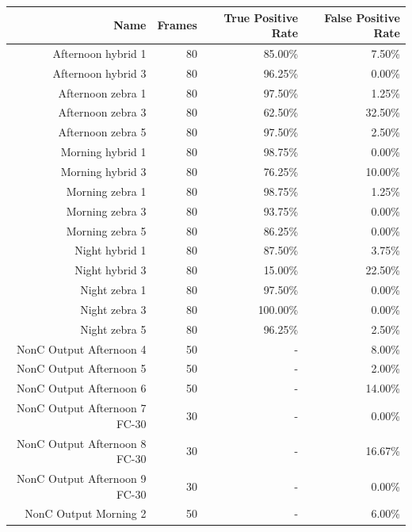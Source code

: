 \documentclass[12pt]{ucthesis}
\begin{document}
    \begin{longtable}{|r|r|r|r|}
    
    \hline
    Name & Frames & True Positive Rate & False Positive Rate \bigstrut\\
    \hline
    Afternoon hybrid 1 & 80 & 85.00\% & 7.50\% \bigstrut\\
    \hline
    Afternoon hybrid 3 & 80 & 96.25\% & 0.00\% \bigstrut\\
    \hline
    Afternoon zebra 1 & 80 & 97.50\% & 1.25\% \bigstrut\\
    \hline
    Afternoon zebra 3 & 80 & 62.50\% & 32.50\% \bigstrut\\
    \hline
    Afternoon zebra 5 & 80 & 97.50\% & 2.50\% \bigstrut\\
    \hline
    Morning hybrid 1 & 80 & 98.75\% & 0.00\% \bigstrut\\
    \hline
    Morning hybrid 3 & 80 & 76.25\% & 10.00\% \bigstrut\\
    \hline
    Morning zebra 1 & 80 & 98.75\% & 1.25\% \bigstrut\\
    \hline
    Morning zebra 3 & 80 & 93.75\% & 0.00\% \bigstrut\\
    \hline
    Morning zebra 5 & 80 & 86.25\% & 0.00\% \bigstrut\\
    \hline
    Night hybrid 1 & 80 & 87.50\% & 3.75\% \bigstrut\\
    \hline
    Night hybrid 3 & 80 & 15.00\% & 22.50\% \bigstrut\\
    \hline
    Night zebra 1 & 80 & 97.50\% & 0.00\% \bigstrut\\
    \hline
    Night zebra 3 & 80 & 100.00\% & 0.00\% \bigstrut\\
    \hline
    Night zebra 5 & 80 & 96.25\% & 2.50\% \bigstrut\\
    \hline
    NonC Output Afternoon 4 & 50 & -  & 8.00\% \bigstrut\\
    \hline
    NonC Output Afternoon 5 & 50 & -  & 2.00\% \bigstrut\\
    \hline
    NonC Output Afternoon 6 & 50 & -  & 14.00\% \bigstrut\\
    \hline
    NonC Output Afternoon 7 FC-30 & 30 & -  & 0.00\% \bigstrut\\
    \hline
    NonC Output Afternoon 8 FC-30 & 30 & -  & 16.67\% \bigstrut\\
    \hline
    NonC Output Afternoon 9 FC-30 & 30 & -  & 0.00\% \bigstrut\\
    \hline
    NonC Output Morning 2 & 50 & -  & 6.00\% \bigstrut\\

\end{longtable}
\end{document}
